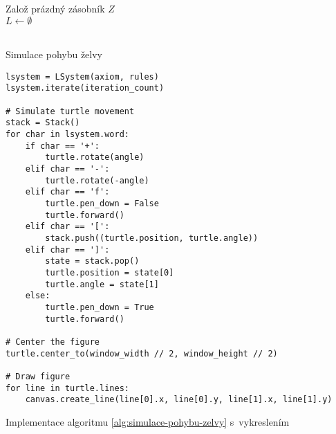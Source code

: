 \begin{algorithm}[h]
    Založ prázdný zásobník $Z$\\
    $L\gets\emptyset$\\
    \\
    \caption{Simulace pohybu želvy}
    \label{alg:simulace-pohybu-zelvy}
\end{algorithm}
\begin{program}[h]
\begin{lstlisting}[style=python]
lsystem = LSystem(axiom, rules)
lsystem.iterate(iteration_count)

# Simulate turtle movement
stack = Stack()
for char in lsystem.word:
    if char == '+':
        turtle.rotate(angle)
    elif char == '-':
        turtle.rotate(-angle)
    elif char == 'f':
        turtle.pen_down = False
        turtle.forward()
    elif char == '[':
        stack.push((turtle.position, turtle.angle))
    elif char == ']':
        state = stack.pop()
        turtle.position = state[0]
        turtle.angle = state[1]
    else:
        turtle.pen_down = True
        turtle.forward()

# Center the figure        
turtle.center_to(window_width // 2, window_height // 2)

# Draw figure
for line in turtle.lines:
    canvas.create_line(line[0].x, line[0].y, line[1].x, line[1].y)
\end{lstlisting}
    \caption{Implementace algoritmu \ref{alg:simulace-pohybu-zelvy} s~vykreslením}
    \label{prog:simulace-pohybu-zelvy-a-vykresleni}
\end{program}